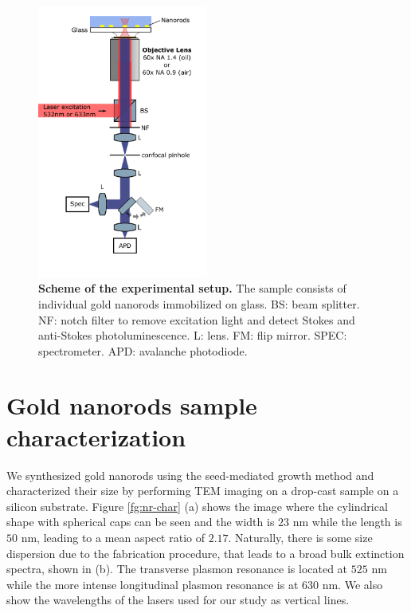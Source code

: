 \documentclass[journal=nalefd,manuscript=letter]{achemso}
\begin{document}
\begin{figure}[htp] \centering
\includegraphics[width=0.5\textwidth]{Figures/Supplementary/02_Setup/setup.png}
\caption{\textbf{Scheme of the experimental setup.} The sample consists of individual gold nanorods immobilized on glass. BS: beam splitter. NF: notch filter to remove excitation light and detect Stokes and anti-Stokes photoluminescence. L: lens. FM: flip mirror. SPEC: spectrometer. APD: avalanche photodiode.}
	\label{fig:setup}
\end{figure}


\section{Gold nanorods sample characterization}

We synthesized gold nanorods using the seed-mediated growth method \cite{nikoobakht2003preparation} 
and characterized their size by performing TEM imaging on a drop-cast sample on a silicon substrate. 
Figure \ref{fg:nr-char} (a) shows the image where the cylindrical shape with spherical caps can be seen 
and the width is $23$ nm while the length is $50$ nm, 
leading to a mean aspect ratio of $2.17$. 
Naturally, there is some size dispersion due to the fabrication procedure, that leads to a broad bulk extinction 
spectra, shown in (b). The transverse plasmon resonance is located at $525$ nm while the more intense 
longitudinal plasmon resonance is at $630$ nm. We also show the wavelengths of the lasers used for 
our study as vertical lines. 
\end{document}
